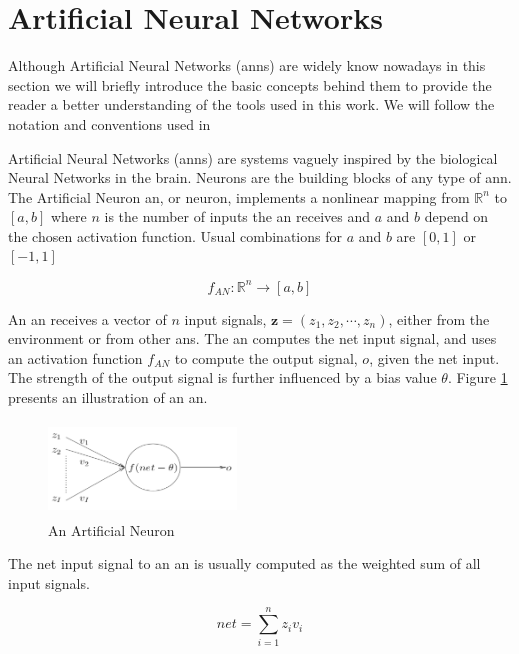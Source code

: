 \section{Artificial Neural Networks}
\label{sec:rul_ann}

Although Artificial Neural Networks (\glspl{ann}) are widely know nowadays in this section we will briefly introduce the basic concepts behind them to provide the reader a better understanding of the tools used in this work. We will follow the notation and conventions used in \cite{Engelbrecht2007}

Artificial Neural Networks (\glspl{ann}) are systems vaguely inspired by the biological Neural Networks in the brain. Neurons are the building blocks of any type of \gls{ann}. The Artificial Neuron \gls{an}, or neuron, implements a nonlinear mapping from $\mathbb{R}^{n}$ to $\left[a,b\right]$ where $n$ is the number of inputs the \gls{an} receives and $a$ and $b$ depend on the chosen activation function. Usual combinations for $a$ and $b$ are $\left[0,1\right]$ or $\left[-1,1\right]$

\begin{equation}
f_{AN} : \mathbb{R}^n \rightarrow \left[a,b\right]
\label{eq:an_def}
\end{equation}

An \gls{an} receives a vector of $n$ input signals, $\mathbf{z} = (z_1, z_2, \cdots , z_n)$, either from the environment or from other \glspl{an}. The \gls{an} computes the net input signal, and uses an activation function $f_{AN}$ to compute the output signal, $o$, given the net input. The strength of the output signal is further influenced by a bias value $\theta$. Figure \ref{fig:an_1} presents an illustration of an \gls{an}.

\begin{figure}[h]
    \centering
    \includegraphics[width = 50mm, height = 25mm]{img/artificial_neuron.png}
    \caption{An Artificial Neuron} 
    \label{fig:an_1}
\end{figure}

The net input signal to an \gls{an} is usually computed as the weighted sum of all input signals.

\begin{equation}
net = \sum_{i=1}^n z_i v_i
\label{eq:an_net}
\end{equation}

